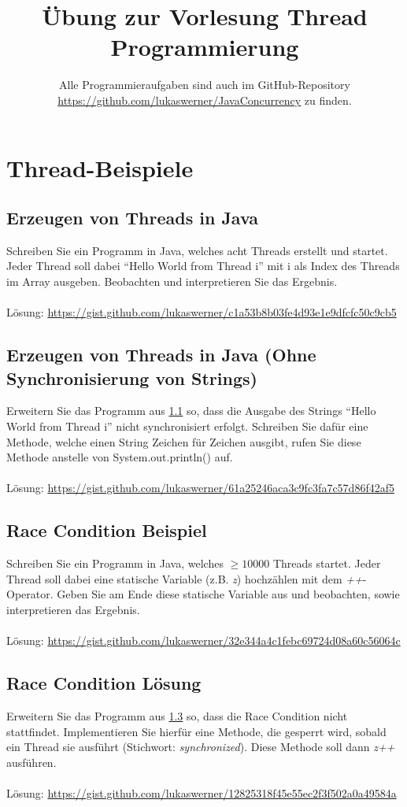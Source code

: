 \documentclass[a4paper]{scrartcl}
\title{Übung zur Vorlesung Thread Programmierung}
\subtitle{Alle Programmieraufgaben sind auch im GitHub-Repository \url{https://github.com/lukaswerner/JavaConcurrency} zu finden.}
\date{}
\begin{document}
	
\maketitle

\section{Thread-Beispiele}

\subsection{Erzeugen von Threads in Java}\label{javathreads}
Schreiben Sie ein Programm in Java, welches acht Threads erstellt und startet. Jeder Thread soll dabei "`Hello World from Thread i"' mit i als Index des Threads im Array ausgeben. Beobachten und interpretieren Sie das Ergebnis.\\
\\
Lösung: \url{https://gist.github.com/lukaswerner/c1a53b8b03fe4d93e1e9dfcfc50c9cb5}

\subsection{Erzeugen von Threads in Java (Ohne Synchronisierung von Strings)}
Erweitern Sie das Programm aus \ref{javathreads} so, dass die Ausgabe des Strings "`Hello World from Thread i"' nicht synchronisiert erfolgt. Schreiben Sie dafür eine Methode, welche einen String Zeichen für Zeichen ausgibt, rufen Sie diese Methode anstelle von System.out.println() auf.\\
\\
Lösung: \url{https://gist.github.com/lukaswerner/61a25246aca3c9fc3fa7c57d86f42af5}

\subsection{Race Condition Beispiel}\label{racecondition}
Schreiben Sie ein Programm in Java, welches $ \geq 10000 $ Threads startet. Jeder Thread soll dabei eine statische Variable (z.B. \emph{z}) hochzählen mit dem \emph{++}-Operator. Geben Sie am Ende diese statische Variable aus und beobachten, sowie interpretieren das Ergebnis.\\
\\
Lösung: \url{https://gist.github.com/lukaswerner/32e344a4c1febc69724d08a60c56064c}

\subsection{Race Condition Lösung}
Erweitern Sie das Programm aus \ref{racecondition} so, dass die Race Condition nicht stattfindet. Implementieren Sie hierfür eine Methode, die gesperrt wird, sobald ein Thread sie ausführt (Stichwort: \emph{synchronized}). Diese Methode soll dann \emph{z++} ausführen.\\
\\
Lösung: \url{https://gist.github.com/lukaswerner/12825318f45e55ec2f3f502a0a49584a}
\end{document}
